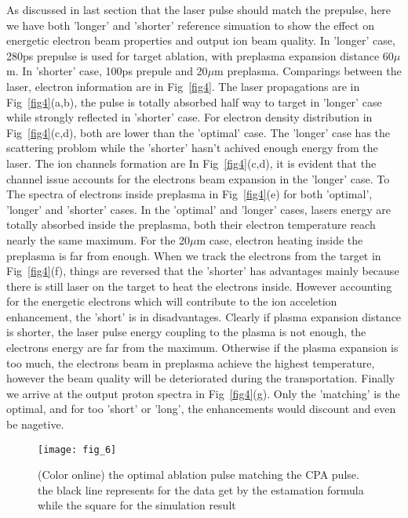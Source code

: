 \documentclass[aip,twocolumn,superscriptaddress,showpacs,amsmath]{revtex4}
\begin{document}
As discussed in last section that the laser pulse should match the prepulse,
here we have both 'longer' and 'shorter' reference simuation to show the effect
on energetic electron beam properties and output ion beam quality. In 'longer' case, 
280ps prepulse is used for target ablation, with preplasma expansion distance 60$\mu$m.
In 'shorter' case, 100ps prepule and 20$\mu$m preplasma. Comparings 
between the laser, electron information are in Fig~\ref{fig4}. 
The laser propagations are in Fig~\ref{fig4}(a,b), the pulse is totally absorbed half way to
target in 'longer' case while strongly reflected in 'shorter' case. For electron
density distribution in Fig~\ref{fig4}(c,d), both are lower than the 'optimal'
case. The 'longer' case has the scattering problom while the 'shorter' hasn't achived 
enough energy from the laser. The ion channels formation are In Fig~\ref{fig4}(c,d), it is
evident that the channel issue accounts for the electrons beam expansion in the 'longer'
case. To  
The spectra of electrons inside preplasma in Fig~\ref{fig4}(e) for both 'optimal', 
'longer' and 'shorter' cases. In the 'optimal' and 'longer' cases, lasers energy are totally absorbed 
inside the preplasma, both their electron temperature reach nearly the same maximum. 
For the 20$\mu$m case, electron heating inside the preplasma is far from enough. When we track the 
electrons from the target in Fig~\ref{fig4}(f), things are reversed that the 'shorter' has advantages 
mainly because there is still laser on the target to heat the electrons inside. However accounting for 
the energetic electrons which will contribute to 
the ion acceletion enhancement, the 'short' is in disadvantages.
Clearly if plasma expansion distance is shorter, the laser pulse energy
coupling to the plasma is not enough, the electrons energy are far 
from the maximum. Otherwise if the plasma
expansion is too much, the electrons beam in preplasma achieve the highest temperature, 
however the beam quality will be deteriorated during the transportation. Finally we arrive at
the output proton spectra in Fig~\ref{fig4}(g). Only the 'matching' is the optimal, and 
for too 'short' or 'long', the enhancements would discount and even be nagetive.





\begin{figure}[htbp]
\texttt{[image: fig\_6]}
\caption{\label{fig6}(Color online) the optimal ablation pulse
matching the CPA pulse. the black line represents for the data get
by the estamation formula while the square for the simulation
result}
\end{figure}
\end{document}
